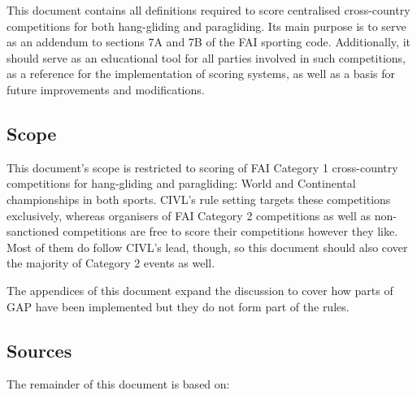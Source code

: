 \documentclass[gap.tex]{subfiles}
\begin{document}
This document contains all definitions required to score centralised
cross-country competitions for both hang-gliding and paragliding. Its main
purpose is to serve as an addendum to sections 7A and 7B of the FAI sporting
code. Additionally, it should serve as an educational tool for all parties
involved in such competitions, as a reference for the implementation of scoring
systems, as well as a basis for future improvements and modifications.

\subsection{Scope}
This document’s scope is restricted to scoring of FAI Category 1 cross-country
competitions for hang-gliding and paragliding: World and Continental
championships in both sports. CIVL’s rule setting targets these competitions
exclusively, whereas organisers of FAI Category 2 competitions as well as
non-sanctioned competitions are free to score their competitions however they
like. Most of them do follow CIVL’s lead, though, so this document should also
cover the majority of Category 2 events as well.

The appendices of this document expand the discussion to cover how parts of GAP
have been implemented but they do not form part of the rules.

\subsection{Sources}
The remainder of this document is based on:
\end{document}

